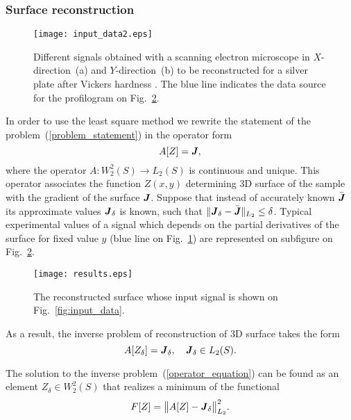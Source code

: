 \documentclass{beamer}
\begin{document}
\begin{frame}[c,allowframebreaks]
    \frametitle{Surface reconstruction}

    \begin{figure}
        \texttt{[image: input\_data2.eps]}
        \caption{Different signals obtained with a scanning electron microscope in $X$-direction~(a) and $Y$-direction~(b) to be reconstructed for a silver plate after Vickers hardness . The blue line indicates the data source for the profilogram on Fig.~\ref{fig:results}.}
        {\label{fig:input_data2}}%
    \end{figure}

    In order to use the least square method we rewrite the statement of the problem~(\ref{problem_statement}) in the operator form
    \begin{equation*}
        \label{operator_equation_0}
        A[Z] = {\textbf{\emph{J}}},
    \end{equation*}
    where the operator $A: W_2^2(S) \to L_2(S)$ is continuous and unique. This operator associates
    the function $Z(x,y)$ determining 3D surface of the sample with the gradient of the surface
    ${\textbf{\emph{J}}}$. Suppose that instead of accurately known $\bar{{\textbf{\emph{J}}}}$
    its approximate values ${\textbf{\emph{J}}}_\delta$ is known, such that
    $\|{\textbf{\emph{J}}}_\delta-\bar{{\textbf{\emph{J}}}}\|_{L_2}\leq\delta$. Typical experimental
    values of a signal which depends on the partial derivatives of the surface for fixed value $y$
    (blue line on Fig.~\ref{fig:input_data2}) are represented on subfigure on Fig.~\ref{fig:results}.

    \begin{figure}[t]
        \texttt{[image: results.eps]}
        \caption{The reconstructed surface whose input signal is shown on  Fig.~\ref{fig:input_data}.}
        {\label{fig:results}}
    \end{figure}

    As a result, the inverse problem of reconstruction of 3D surface takes the form
    \begin{equation}
        \label{operator_equation}
        A[Z_\delta] = {\textbf{\emph{J}}}_\delta, \quad {\textbf{\emph{J}}}_\delta \in L_2(S).
    \end{equation}


    The solution to the inverse problem~(\ref{operator_equation}) can be found as an element $Z_\delta \in W_2^2(S)$ that realizes a minimum of the functional
    \begin{equation}
        \label{functional}
        F[Z] = \big\|A[Z] - {\textbf{\emph{J}}}_\delta\big\|_{L_2}^2.
    \end{equation}
\end{frame}
\end{document}
